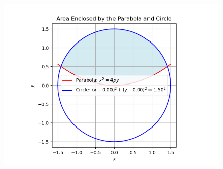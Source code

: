 \documentclass[journal]{IEEEtran}
\begin{document}
\begin{figure}[h!]
   \centering
   \includegraphics[width=\linewidth]{figs/fig2.png}
   \label{stemplot}
   \caption{}
\end{figure}
\end{document}
